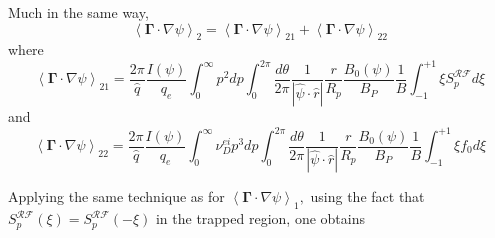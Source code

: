 Much in the same way,
\begin{equation}
\left\langle \mathbf{\Gamma }\cdot \nabla \psi \right\rangle
_{2}=\left\langle \mathbf{\Gamma }\cdot \nabla \psi \right\rangle
_{21}+\left\langle \mathbf{\Gamma }\cdot \nabla \psi \right\rangle _{22}
\end{equation}
where
\begin{equation}
\left\langle \mathbf{\Gamma }\cdot \nabla \psi \right\rangle _{21}=\frac{
2\pi }{\widehat{q}}\frac{I\left( \psi \right) }{q_{e}}\int_{0}^{\infty
}p^{2}dp\int_{0}^{2\pi }\frac{d\theta }{2\pi }\frac{1}{\left| \widehat{\psi }
\cdot \widehat{r}\right| }\frac{r}{R_{p}}\frac{B_{0}\left( \psi \right) }{
B_{P}}\frac{1}{B}\int_{-1}^{+1}\xi S_{p}^{\mathcal{RF}}d\xi
\end{equation}
and
\begin{equation}
\left\langle \mathbf{\Gamma }\cdot \nabla \psi \right\rangle _{22}=\frac{
2\pi }{\widehat{q}}\frac{I\left( \psi \right) }{q_{e}}\int_{0}^{\infty }\nu
_{D}^{ei}p^{3}dp\int_{0}^{2\pi }\frac{d\theta }{2\pi }\frac{1}{\left|
\widehat{\psi }\cdot \widehat{r}\right| }\frac{r}{R_{p}}\frac{B_{0}\left(
\psi \right) }{B_{P}}\frac{1}{B}\int_{-1}^{+1}\xi f_{0}d\xi
\end{equation}

Applying the same technique as for $\left\langle \mathbf{\Gamma }\cdot
\nabla \psi \right\rangle _{1},$ using the fact that $S_{p}^{\mathcal{RF}
}\left( \xi \right) =S_{p}^{\mathcal{RF}}\left( -\xi \right) $ in the
trapped region, one obtains

